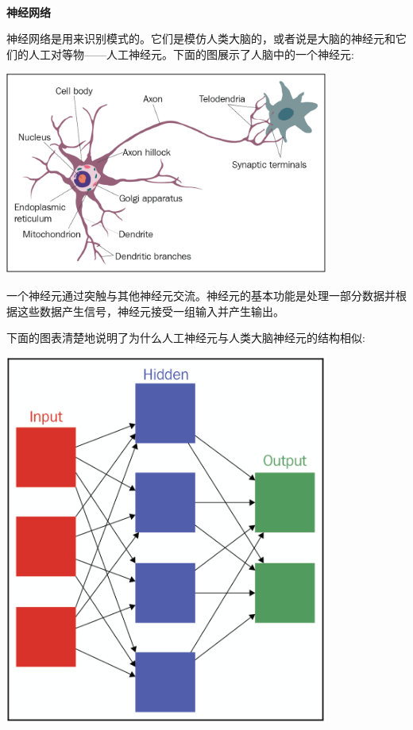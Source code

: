 \noindent\textbf{}\ \par
\textbf{神经网络} \ \par
神经网络是用来识别模式的。它们是模仿人类大脑的，或者说是大脑的神经元和它们的人工对等物——人工神经元。下面的图展示了人脑中的一个神经元: \par

\begin{center}
	\includegraphics[width=0.8\textwidth]{content/Section-3/Chapter-15/9}
\end{center}

一个神经元通过突触与其他神经元交流。神经元的基本功能是处理一部分数据并根据这些数据产生信号，神经元接受一组输入并产生输出。 \par
下面的图表清楚地说明了为什么人工神经元与人类大脑神经元的结构相似: \par

\begin{center}
	\includegraphics[width=0.8\textwidth]{content/Section-3/Chapter-15/10}
\end{center}

